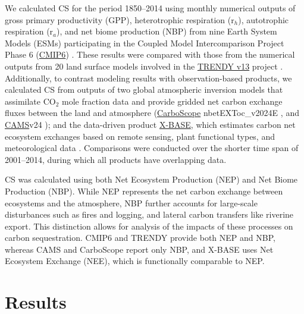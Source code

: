 \documentclass[9pt,twocolumn,twoside]{pnas-new}
\begin{document}
We calculated CS for the period 1850–2014 using monthly numerical outputs of gross primary productivity (GPP), heterotrophic respiration (r$_h$), autotrophic respiration (r$_a$), and net biome production (NBP) from nine Earth System Models (ESMs) participating in the Coupled Model Intercomparison Project Phase 6 (\hyperlink{https://pcmdi.llnl.gov/CMIP6/}{CMIP6}) \cite{Eyring2016}. These results were compared with those from the numerical outputs from 20 land surface models involved in the \hyperlink{https://globalcarbonbudgetdata.org/}{TRENDY v13} project \cite{Sitch2024}. Additionally, to contrast modeling results with observation-based products, we calculated CS from outputs of two global atmospheric inversion models that assimilate CO$_2$ mole fraction data and provide gridded net carbon exchange fluxes between the land and atmosphere (\hyperlink{https://www.bgc-jena.mpg.de/CarboScope/}{CarboScope} nbetEXToc\_v2024E \cite{Rodenbeck2005}, and \hyperlink{https://ads.atmosphere.copernicus.eu/datasets/cams-global-greenhouse-gas-inversion?tab=overview}{CAMS}v24 \cite{Chevallier2013}); and the data-driven product \hyperlink{https://www.icos-cp.eu/data-products/fluxcom-x-global-fluxes-collection}{X-BASE}, which estimates carbon net ecosystem exchanges based on remote sensing, plant functional types, and meteorological data \cite{Nelson2024}. Comparisons were conducted over the shorter time span of 2001–2014, during which all products have overlapping data.

CS was calculated using both Net Ecosystem Production (NEP) and Net Biome Production (NBP). While NEP represents the net carbon exchange between ecosystems and the atmosphere, NBP further accounts for large-scale disturbances such as fires and logging, and lateral carbon transfers like riverine export. This distinction allows for analysis of the impacts of these processes on carbon sequestration. CMIP6 and TRENDY provide both NEP and NBP, whereas CAMS and CarboScope report only NBP, and X-BASE uses Net Ecosystem Exchange (NEE), which is functionally comparable to NEP.


\section*{Results}
\end{document}
